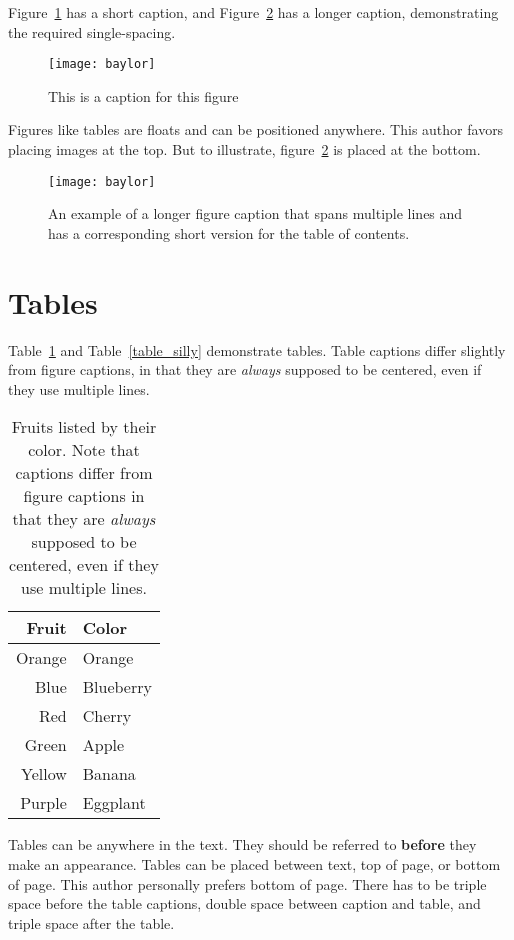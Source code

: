 Figure~\ref{figure_example1} has a short caption, and
Figure~\ref{figure_example2} has a longer caption, demonstrating the required
single-spacing.

\begin{figure}[ht]
\centering
\texttt{[image: baylor]}
\caption{This is a caption for this figure}
\label{figure_example1}
\end{figure}

Figures like tables are floats and can be positioned anywhere. 
This author favors placing images at the top. 
But to illustrate, figure~\ref{figure_example2} is placed at the bottom. 

\begin{figure}[b]
\centering
\texttt{[image: baylor]}
\caption[The short table of contents version]{An example of a longer figure
caption that spans multiple lines and has a corresponding short version for the
table of contents.}
\label{figure_example2}
\end{figure}

\section{Tables}

Table~\ref{table_fruit} and Table~\ref{table_silly} demonstrate tables. Table
captions differ slightly from figure captions, in that they are \textit{always}
supposed to be centered, even if they use multiple lines.

\begin{table}[h]
\centering
\caption[Fruits by color]{\centering Fruits listed by their color. Note that
captions differ from figure captions in that they are \textit{always} supposed
to be centered, even if they use multiple lines.}
\label{table_fruit}
\begin{tabular}{rl}
    \hline
    Fruit & Color  \\  \hline
    Orange & Orange \\
    Blue & Blueberry \\
    Red & Cherry \\
    Green & Apple \\
    Yellow & Banana \\
    Purple & Eggplant \\
    \hline
\end{tabular}
\end{table}

Tables can be anywhere in the text. They should be referred to \textbf{before} they make an appearance. 
Tables can be placed between text, top of page, or bottom of page. This author personally prefers bottom of page. 
There has to be triple space before the table captions, double space between caption and table, and triple space after the table. 


